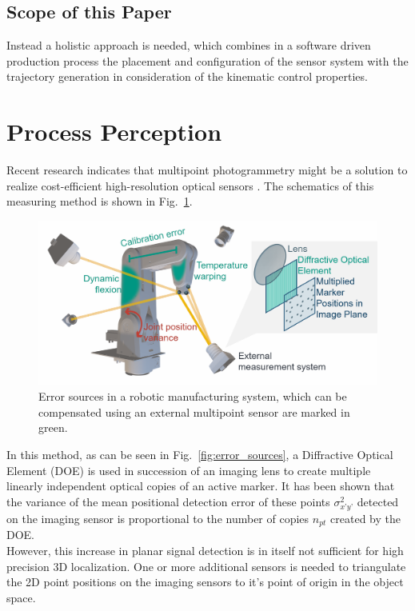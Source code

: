 \documentclass[5p,times,procedia]{elsarticle}
\begin{document}
\subsection{Scope of this Paper}
%
Instead a holistic approach is needed, which combines in a software driven production process the placement and configuration of the sensor system with the trajectory generation in consideration of the kinematic control properties.
%
%
%
%
\section{Process Perception}
%
Recent research indicates that multipoint photogrammetry might be a solution to realize cost-efficient high-resolution optical sensors \cite{Hartlieb_2021}.
The schematics of this measuring method is shown in Fig.~\ref{fig:MeasSys_Errors}.
\begin{figure}[h]
	\centering
	\includegraphics[width=0.9\columnwidth]{graphics/error_sources.png}
	\caption{Error sources in a robotic manufacturing system, which can be compensated using an external multipoint  sensor are marked in green.}
	\label{fig:MeasSys_Errors}
\end{figure}
In this method, as can be seen in Fig.~\ref{fig:error_sources}, a Diffractive Optical Element (DOE) is used in succession of an imaging lens to create multiple linearly independent optical copies of an active marker.
It has been shown \cite{Hartlieb_2021} that the variance of the mean positional detection error of these points $\sigma_{x’y’}^2$ detected on the imaging sensor is proportional to the number of copies $n_{pt}$ created by the DOE.\\
However, this increase in planar signal detection is in itself not sufficient for high precision 3D localization. One or more additional sensors is needed to triangulate the 2D point positions on the imaging sensors to it’s point of origin in the object space. \\
\end{document}
